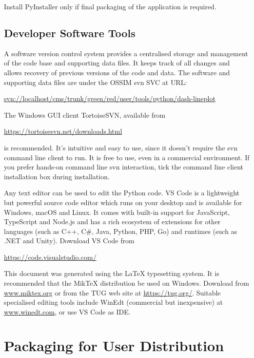 Install PyInstaller only if final packaging of the application is required.

\subsection{Developer Software Tools}

\label{sec:devtools}

A software version control system provides a centralised storage and management of the code base and supporting data files.
It keeps track of all changes and allows recovery of previous versions of the code and data.
The software and supporting data files are under the \ac{OSSIM}  \ac{svn} \ac{SVC} at \ac{URL}:

\footnotesize
\url{svn://localhost/cms/trunk/green/red/user/tools/python/dash-lineplot}
\normalsize

The Windows \ac{GUI} client TortoiseSVN, available from

\url{https://tortoisesvn.net/downloads.html}

is recommended. It's intuitive and easy to use, since it doesn't require the \ac{svn} command line client to run. It is free to use, even in a commercial environment. If you prefer hands-on command line \ac{svn} interaction, tick the command line client installation box during installation.

Any text editor can be used to edit the Python code. \ac{VS} Code is a lightweight but powerful source code editor which runs on your desktop and is available for Windows, macOS and Linux. It comes with built-in support for JavaScript, TypeScript and Node.js and has a rich ecosystem of extensions for other languages (such as C++, C\#, Java, Python, PHP, Go) and runtimes (such as .NET and Unity). Download \ac{VS} Code from

\url{https://code.visualstudio.com/}

This document was generated using the \LaTeX{} typesetting system. It is recommended that the MikTeX distribution be used on Windows. Download from \url{www.miktex.org} or from the \ac{TUG} web site at \url{https://tug.org/}. Suitable specialised editing tools include WinEdt (commercial but inexpensive) at \url{www.winedt.com}, or use \ac{VS} Code as \ac{IDE}.


\section{Packaging for User Distribution}
\label{sec:pyinstaller}

